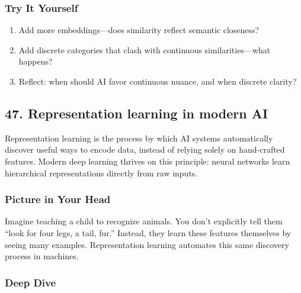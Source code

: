 \documentclass[
  letterpaper,
  DIV=11,
  numbers=noendperiod]{scrreprt}
\providecommand{\tightlist}{%
  \setlength{\itemsep}{0pt}\setlength{\parskip}{0pt}}
\begin{document}
\subsubsection{Try It Yourself}\label{try-it-yourself-45}

\begin{enumerate}
\def\labelenumi{\arabic{enumi}.}
\tightlist
\item
  Add more embeddings---does similarity reflect semantic closeness?
\item
  Add discrete categories that clash with continuous similarities---what
  happens?
\item
  Reflect: when should AI favor continuous nuance, and when discrete
  clarity?
\end{enumerate}

\subsection{47. Representation learning in modern
AI}\label{representation-learning-in-modern-ai}

Representation learning is the process by which AI systems automatically
discover useful ways to encode data, instead of relying solely on
hand-crafted features. Modern deep learning thrives on this principle:
neural networks learn hierarchical representations directly from raw
inputs.

\subsubsection{Picture in Your Head}\label{picture-in-your-head-46}

Imagine teaching a child to recognize animals. You don't explicitly tell
them ``look for four legs, a tail, fur.'' Instead, they learn these
features themselves by seeing many examples. Representation learning
automates this same discovery process in machines.

\subsubsection{Deep Dive}\label{deep-dive-46}
\end{document}
